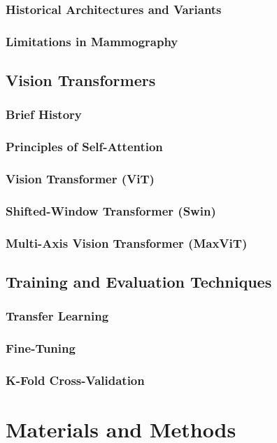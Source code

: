 \documentclass[a4paper,10pt]{book}
\begin{document}
\subsection{Historical Architectures and Variants}
\subsection{Limitations in Mammography}

\section{Vision Transformers}
\subsection{Brief History}
\subsection{Principles of Self-Attention}
\subsection{Vision Transformer (ViT)}
\subsection{Shifted-Window Transformer (Swin)}
\subsection{Multi-Axis Vision Transformer (MaxViT)}

\section{Training and Evaluation Techniques}
\subsection{Transfer Learning}
\subsection{Fine-Tuning}
\subsection{K-Fold Cross-Validation}
\chapter{Materials and Methods}
\end{document}
